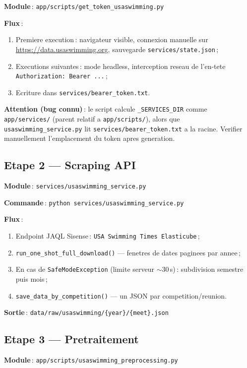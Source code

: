 \documentclass[11pt,a4paper]{article}
\begin{document}
\textbf{Module}\,: \texttt{app/scripts/get\_token\_usaswimming.py}

\textbf{Flux}\,:
\begin{enumerate}
  \item Premiere execution\,: navigateur visible, connexion manuelle sur \url{https://data.usaswimming.org}, sauvegarde \texttt{services/state.json}\,;
  \item Executions suivantes\,: mode headless, interception reseau de l'en-tete \texttt{Authorization: Bearer ...}\,;
  \item Ecriture dans \texttt{services/bearer\_token.txt}.
\end{enumerate}

\textbf{Attention (bug connu)}\,: le script calcule \texttt{\_SERVICES\_DIR} comme \texttt{app/services/} (parent relatif a \texttt{app/scripts/}), alors que \texttt{usaswimming\_service.py} lit \texttt{services/bearer\_token.txt} a la racine. Verifier manuellement l'emplacement du token apres generation.

\subsection{Etape 2 --- Scraping API}

\textbf{Module}\,: \texttt{services/usaswimming\_service.py}

\textbf{Commande}\,: \texttt{python services/usaswimming\_service.py}

\textbf{Flux}\,:
\begin{enumerate}
  \item Endpoint JAQL Sisense\,: \texttt{USA Swimming Times Elasticube}\,;
  \item \texttt{run\_one\_shot\_full\_download()} --- fenetres de dates paginees par annee\,;
  \item En cas de \texttt{SafeModeException} (limite serveur $\sim$30\,s)\,: subdivision semestre puis mois\,;
  \item \texttt{save\_data\_by\_competition()} --- un JSON par competition/reunion.
\end{enumerate}

\textbf{Sortie}\,: \texttt{data/raw/usaswimming/\{year\}/\{meet\}.json}

\subsection{Etape 3 --- Pretraitement}

\textbf{Module}\,: \texttt{app/scripts/usaswimming\_preprocessing.py}
\end{document}
